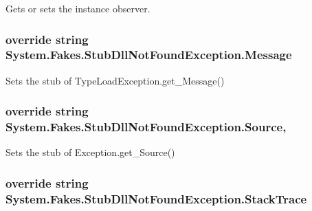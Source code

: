 Gets or sets the instance observer.

\hypertarget{class_system_1_1_fakes_1_1_stub_dll_not_found_exception_ad83cc280260af6083807f2819b694885}{
\subsubsection[{Message}]{\setlength{\rightskip}{0pt plus 5cm}override string System.\-Fakes.\-Stub\-Dll\-Not\-Found\-Exception.\-Message\hspace{0.3cm}{\ttfamily [get]}}}\label{class_system_1_1_fakes_1_1_stub_dll_not_found_exception_ad83cc280260af6083807f2819b694885}


Sets the stub of Type\-Load\-Exception.\-get\-\_\-\-Message()

\hypertarget{class_system_1_1_fakes_1_1_stub_dll_not_found_exception_a890f628e0dddc03747667fa798e4b348}{
\subsubsection[{Source}]{\setlength{\rightskip}{0pt plus 5cm}override string System.\-Fakes.\-Stub\-Dll\-Not\-Found\-Exception.\-Source\hspace{0.3cm}{\ttfamily [get]}, {\ttfamily [set]}}}\label{class_system_1_1_fakes_1_1_stub_dll_not_found_exception_a890f628e0dddc03747667fa798e4b348}


Sets the stub of Exception.\-get\-\_\-\-Source()

\hypertarget{class_system_1_1_fakes_1_1_stub_dll_not_found_exception_a103f2f681755efbb7c7157a3135463e0}{
\subsubsection[{Stack\-Trace}]{\setlength{\rightskip}{0pt plus 5cm}override string System.\-Fakes.\-Stub\-Dll\-Not\-Found\-Exception.\-Stack\-Trace\hspace{0.3cm}{\ttfamily [get]}}}\label{class_system_1_1_fakes_1_1_stub_dll_not_found_exception_a103f2f681755efbb7c7157a3135463e0}


